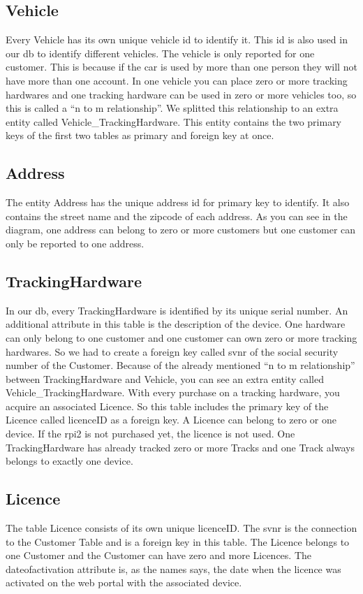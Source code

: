 \subsection{Vehicle}
Every Vehicle has its own unique vehicle id to identify it. This id is also used in our \gls{db} to identify different vehicles. The vehicle is only reported for one customer. This is because if the car is used by more than one person they will not have more than one account. In one vehicle you can place zero or more tracking hardwares and one tracking hardware can be used in zero or more vehicles too, so this is called a “n to m relationship”. We splitted this relationship to an extra entity called Vehicle\_TrackingHardware. This entity contains the two primary keys of the first two tables as primary and foreign key at once.
\subsection{Address}
The entity Address has the unique address id for primary key to identify. It also contains the street name and the zipcode of each address. As you can see in the diagram, one address can belong to zero or more customers but one customer can only be reported to one address.
\subsection{TrackingHardware}
In our \gls{db}, every TrackingHardware is identified by its unique serial number. An additional attribute in this table is the description of the device. One hardware can only belong to one customer and one customer can own zero or more tracking hardwares. So we had to create a foreign key called svnr of the social security number of the Customer. Because of the already mentioned “n to m relationship” between TrackingHardware and Vehicle, you can see an extra entity called Vehicle\_TrackingHardware. With every purchase on a tracking hardware, you acquire an associated Licence. So this table includes the primary key of the Licence called licenceID as a foreign key. A Licence can belong to zero or one device. If the \gls{rpi2} is not purchased yet, the licence is not used. One TrackingHardware has already tracked zero or more Tracks and one Track always belongs to exactly one device.
\subsection{Licence}
The table Licence consists of its own unique licenceID. The svnr is the connection to the Customer Table and is a foreign key in this table. The Licence belongs to one Customer and the Customer can have zero and more Licences. The dateofactivation attribute is, as the names says, the date when the licence was activated on the web portal with the associated device.

